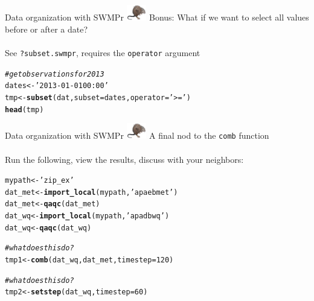 \documentclass[xcolor=dvipsnames]{beamer}\usepackage[]{graphicx}\usepackage[]{color}
\makeatletter
\newcommand{\hlnum}[1]{\textcolor[rgb]{0.686,0.059,0.569}{#1}}%
\newcommand{\hlstr}[1]{\textcolor[rgb]{0.192,0.494,0.8}{#1}}%
\newcommand{\hlcom}[1]{\textcolor[rgb]{0.678,0.584,0.686}{\textit{#1}}}%
\newcommand{\hlstd}[1]{\textcolor[rgb]{0.345,0.345,0.345}{#1}}%
\newcommand{\hlkwb}[1]{\textcolor[rgb]{0.69,0.353,0.396}{#1}}%
\newcommand{\hlkwc}[1]{\textcolor[rgb]{0.333,0.667,0.333}{#1}}%
\newcommand{\hlkwd}[1]{\textcolor[rgb]{0.737,0.353,0.396}{\textbf{#1}}}%
\newenvironment{kframe}{%
 \def\at@end@of@kframe{}%
 \ifinner\ifhmode%
  \def\at@end@of@kframe{\end{minipage}}%
  \begin{minipage}{\columnwidth}%
 \fi\fi%
 \def\FrameCommand##1{\hskip\@totalleftmargin \hskip-\fboxsep
 \colorbox{shadecolor}{##1}\hskip-\fboxsep
     \hskip-\linewidth \hskip-\@totalleftmargin \hskip\columnwidth}%
 \MakeFramed {\advance\hsize-\width
   \@totalleftmargin\z@ \linewidth\hsize
   \@setminipage}}%
 {\par\unskip\endMakeFramed%
 \at@end@of@kframe}
\newenvironment{knitrout}{}{} %
\makeatother
\begin{document}
\begin{frame}[fragile]{Data organization with SWMPr \includegraphics[width = 0.065\textwidth]{imgs/swmprat.png}}
\onslide<+->
Bonus: What if we want to select all values before or after a date?  \\~\\
See \texttt{?subset.swmpr}, requires the \texttt{operator} argument
\onslide<+->
\begin{knitrout}\scriptsize
{}\color{fgcolor}\begin{kframe}
\begin{alltt}
\hlcom{# get observations for 2013}
\hlstd{dates} \hlkwb{<-} \hlstr{'2013-01-01 00:00'}
\hlstd{tmp} \hlkwb{<-} \hlkwd{subset}\hlstd{(dat,} \hlkwc{subset} \hlstd{= dates,} \hlkwc{operator} \hlstd{=} \hlstr{'>='}\hlstd{)}
\hlkwd{head}\hlstd{(tmp)}
\end{alltt}
\end{kframe}
\end{knitrout}
\end{frame}

\begin{frame}[fragile]{Data organization with SWMPr \includegraphics[width = 0.065\textwidth]{imgs/swmprat.png}}
\onslide<+->
A final nod to the \texttt{comb} function \\~\\
Run the following, view the results, discuss with your neighbors:
\begin{knitrout}\scriptsize
{}\color{fgcolor}\begin{kframe}
\begin{alltt}
\hlstd{mypath} \hlkwb{<-} \hlstr{'zip_ex'}
\hlstd{dat_met} \hlkwb{<-} \hlkwd{import_local}\hlstd{(mypath,} \hlstr{'apaebmet'}\hlstd{)}
\hlstd{dat_met} \hlkwb{<-} \hlkwd{qaqc}\hlstd{(dat_met)}
\hlstd{dat_wq} \hlkwb{<-} \hlkwd{import_local}\hlstd{(mypath,} \hlstr{'apadbwq'}\hlstd{)}
\hlstd{dat_wq} \hlkwb{<-} \hlkwd{qaqc}\hlstd{(dat_wq)}

\hlcom{# what does this do?}
\hlstd{tmp1} \hlkwb{<-} \hlkwd{comb}\hlstd{(dat_wq, dat_met,} \hlkwc{timestep} \hlstd{=} \hlnum{120}\hlstd{)}

\hlcom{# what does this do?}
\hlstd{tmp2} \hlkwb{<-} \hlkwd{setstep}\hlstd{(dat_wq,} \hlkwc{timestep} \hlstd{=} \hlnum{60}\hlstd{)}
\end{alltt}
\end{kframe}
\end{knitrout}
\end{frame}
\end{document}
